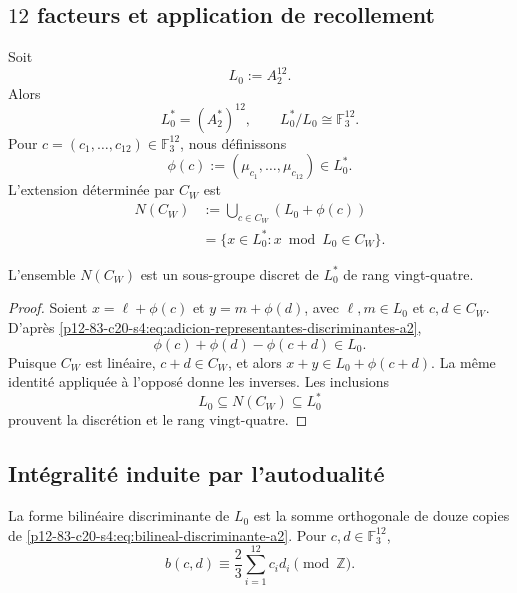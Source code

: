 \subsection{\(12\) facteurs et application de recollement}

Soit
\[
 L_0:=A_2^{12}.
\]
Alors
\[
 L_0^*=(A_2^*)^{12},
 \qquad
 L_0^*/L_0\cong\mathbb F_3^{12}.
\]
Pour \(c=(c_1,\ldots,c_{12})\in\mathbb F_3^{12}\), nous définissons
\begin{equation}
 \phi(c):=(\mu_{c_1},\ldots,\mu_{c_{12}})\in L_0^*.
 \label{p12-83-c20-s4:eq:aplicacion-pegado-cw}
\end{equation}
L'extension déterminée par \(C_W\) est
\begin{equation}
 \begin{aligned}
 N(C_W)
 &:=\bigcup_{c\in C_W}(L_0+\phi(c))\\
 &=\{x\in L_0^*:x\bmod L_0\in C_W\}.
 \end{aligned}
 \label{p12-83-c20-s4:eq:definicion-niemeier-cw}
\end{equation}

\begin{lemma}
\label{p12-83-c20-s4:lem:clausura-pegado-cw}
L'ensemble \(N(C_W)\) est un sous-groupe discret de \(L_0^*\) de rang
vingt-quatre.
\end{lemma}

\begin{proof}
Soient \(x=\ell+\phi(c)\) et \(y=m+\phi(d)\), avec \(\ell,m\in L_0\) et
\(c,d\in C_W\). D'après \eqref{p12-83-c20-s4:eq:adicion-representantes-discriminantes-a2},
\[
 \phi(c)+\phi(d)-\phi(c+d)\in L_0.
\]
Puisque \(C_W\) est linéaire, \(c+d\in C_W\), et alors
\(x+y\in L_0+\phi(c+d)\). La même identité appliquée à l'opposé donne
les inverses. Les inclusions
\[
 L_0\subseteq N(C_W)\subseteq L_0^*
\]
prouvent la discrétion et le rang vingt-quatre.
\end{proof}

\subsection{Intégralité induite par l'autodualité}

La forme bilinéaire discriminante de \(L_0\) est la somme orthogonale de douze
copies de \eqref{p12-83-c20-s4:eq:bilineal-discriminante-a2}. Pour
\(c,d\in\mathbb F_3^{12}\),
\begin{equation}
 b(c,d)
 \equiv\frac23\sum_{i=1}^{12}c_id_i
 \pmod{\mathbb Z}.
 \label{p12-83-c20-s4:eq:bilineal-discriminante-a2-doce}
\end{equation}

